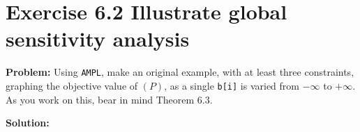 \section{Exercise 6.2 Illustrate global sensitivity analysis}
\textbf{Problem:} Using {\tt AMPL}, make an original example, with at least three constraints, graphing the objective value of $(P)$, as a single {\tt b[i]} is varied from $-\infty$ to $+\infty$. As you work on this, bear in mind Theorem 6.3.

\textbf{Solution:} 